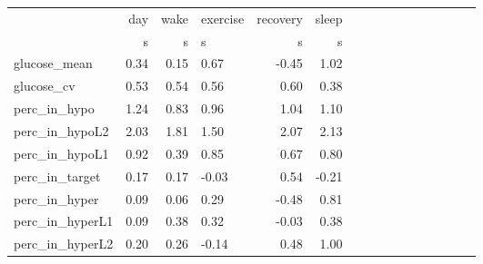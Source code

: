 \begin{tabular}{lrrlrrlrrlrrlrrl}
\toprule
{} &   day &  wake & exercise & recovery & sleep \\
{} &     s &     s &        s &        s &     s \\
\midrule
glucose_mean    &  0.34 &  0.15 &     0.67 &    -0.45 &  1.02 \\
glucose_cv      &  0.53 &  0.54 &     0.56 &     0.60 &  0.38 \\
perc_in_hypo    &  1.24 &  0.83 &     0.96 &     1.04 &  1.10 \\
perc_in_hypoL2  &  2.03 &  1.81 &     1.50 &     2.07 &  2.13 \\
perc_in_hypoL1  &  0.92 &  0.39 &     0.85 &     0.67 &  0.80 \\
perc_in_target  &  0.17 &  0.17 &    -0.03 &     0.54 & -0.21 \\
perc_in_hyper   &  0.09 &  0.06 &     0.29 &    -0.48 &  0.81 \\
perc_in_hyperL1 &  0.09 &  0.38 &     0.32 &    -0.03 &  0.38 \\
perc_in_hyperL2 &  0.20 &  0.26 &    -0.14 &     0.48 &  1.00 \\
\bottomrule
\end{tabular}
